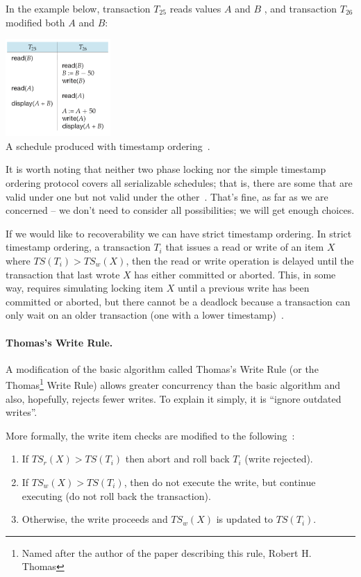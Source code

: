 In the example below, transaction $T_{25}$ reads values $A$ and $B$ , and transaction $T_{26}$ modified both $A$ and $B$:

\begin{center}
	\includegraphics[width=0.3\textwidth]{images/timestamp-schedule}\\
	A schedule produced with timestamp ordering~\cite{dsc}.
\end{center}

It is worth noting that neither two phase locking nor the simple timestamp ordering protocol covers all serializable schedules; that is, there are some that are valid under one but not valid under the other~\cite{fds}. That's fine, as far as we are concerned -- we don't need to consider all possibilities; we will get enough choices.

If we would like to recoverability we can have strict timestamp ordering. In strict timestamp ordering, a transaction $T_{i}$ that issues a read or write of an item $X$ where $T\!S(T_{i}) > T\!S_{w}(X)$, then the read or write operation is delayed until the transaction that last wrote $X$ has either committed or aborted. This, in some way, requires simulating locking item $X$ until a previous write has been committed or aborted, but there cannot be a deadlock because a transaction can only wait on an older transaction (one with a  lower timestamp)~\cite{fds}.

\paragraph{Thomas's Write Rule.} A modification of the basic algorithm called Thomas's Write Rule (or the Thomas\footnote{Named after the author of the paper describing this rule, Robert H. Thomas} Write Rule) allows greater concurrency than the basic algorithm and also, hopefully, rejects fewer writes. To explain it simply, it is ``ignore outdated writes''.

More formally, the write item checks are modified to the following~\cite{fds}:
\begin{enumerate}
	\item If $T\!S_{r}(X) > T\!S(T_{i})$ then abort and roll back $T_{i}$ (write rejected).
	\item If $T\!S_{w}(X) > T\!S(T_{i})$, then do not execute the write, but continue executing (do not roll back the transaction).
	\item Otherwise, the write proceeds and $T\!S_{w}(X)$ is updated to $T\!S(T_{i})$. 
\end{enumerate}

